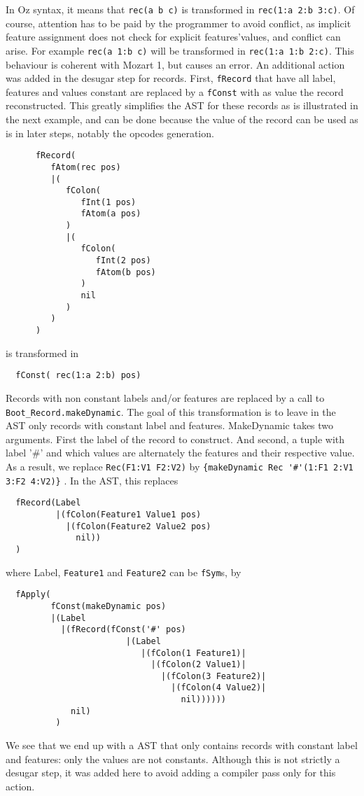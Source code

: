 \documentclass[a4paper]{memoir}
\begin{document}
In Oz syntax, it means that \lstinline!rec(a b c)! is transformed in \lstinline!rec(1:a 2:b 3:c)!. Of course, attention has to be paid by the programmer to avoid conflict, as implicit feature assignment does not check for explicit features'values, and conflict can arise. For example \lstinline!rec(a 1:b c)! will be transformed in \lstinline!rec(1:a 1:b 2:c)!. This behaviour is coherent with Mozart 1, but causes an error. %
An additional action was added in the desugar step for records. First, \lstinline!fRecord! that have all label, features and values constant are replaced by a \lstinline!fConst! with as value the record reconstructed. This greatly simplifies the AST for these records as is illustrated in the next example, and can be done because the value of the record can be used as is in later steps, notably the opcodes generation. 
\begin{lstlisting}
      fRecord(
         fAtom(rec pos)
         |(
            fColon(
               fInt(1 pos)
               fAtom(a pos)
            )
            |(
               fColon(
                  fInt(2 pos)
                  fAtom(b pos)
               )
               nil
            )
         )
      )
\end{lstlisting}
is transformed in
\begin{lstlisting}
  fConst( rec(1:a 2:b) pos)
\end{lstlisting}


Records with non constant labels and/or features are replaced by a call to \lstinline!Boot_Record.makeDynamic!. The goal of this transformation is to leave in the AST only records with constant label and features. MakeDynamic takes two arguments. First the label of the record to construct. And second, a tuple with label '\#' and which values are alternately the features and their respective value. As a result, we replace \lstinline!Rec(F1:V1 F2:V2)! by \lstinline!{makeDynamic Rec '#'(1:F1 2:V1 3:F2 4:V2)}! .
In the AST, this replaces 
\begin{lstlisting}
  fRecord(Label 
          |(fColon(Feature1 Value1 pos)
            |(fColon(Feature2 Value2 pos)
              nil))
  )
\end{lstlisting}
where Label, \lstinline!Feature1! and \lstinline!Feature2! can be
\lstinline!fSym!s, by
\begin{lstlisting}
  fApply(
         fConst(makeDynamic pos) 
         |(Label
           |(fRecord(fConst('#' pos) 
                        |(Label
                           |(fColon(1 Feature1)|
                             |(fColon(2 Value1)|
                               |(fColon(3 Feature2)|
                                 |(fColon(4 Value2)|
                                   nil))))))
             nil)
          )
\end{lstlisting}
We see that we end up with a AST that only contains records with constant label and features: only the values are not constants.
Although this is not strictly a desugar step, it was added here to avoid adding a compiler pass only for this action.
\end{document}

